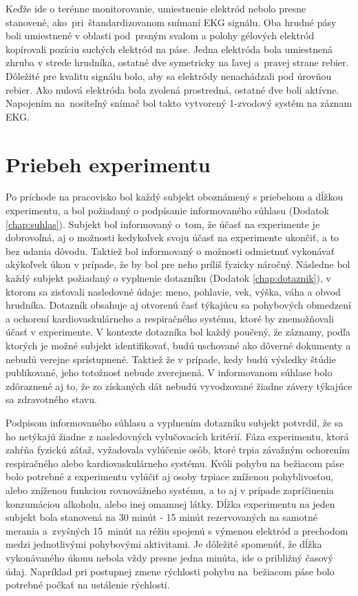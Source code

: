  Keďže ide o terénne monitorovanie, umiestnenie elektród nebolo presne stanovené, ako~pri~štandardizovanom snímaní EKG signálu. Oba hrudné pásy boli umiestnené v oblasti pod~prsným svalom a polohy gélových elektród kopírovali pozíciu suchých elektród na páse. Jedna elektróda bola umiestnená zhruba v strede hrudníka, ostatné dve symetricky na ľavej a~pravej strane rebier. Dôležité pre kvalitu signálu bolo, aby sa elektródy nenachádzali pod úrovňou rebier. Ako nulová elektróda bola zvolená prostredná, ostatné dve boli aktívne. Napojením na~nositeľný snímač bol takto vytvorený 1-zvodový systém na záznam EKG.

\newpage

\section{Priebeh experimentu}

Po príchode na pracovisko bol každý subjekt oboznámený s priebehom a dĺžkou experimentu, a bol požiadaný o podpísanie informovaného súhlasu (Dodatok \ref{chap:suhlas}). Subjekt bol informovaný o~tom, že účasť na experimente je dobrovoľná, aj o možnosti kedykoľvek svoju účasť na experimente ukončiť, a to bez udania dôvodu. Taktiež bol informovaný o možnosti odmietnuť vykonávať akýkoľvek úkon v prípade, že by bol pre neho príliš fyzicky náročný. Následne bol každý subjekt požiadaný o vyplnenie dotazníku (Dodatok \ref{chap:dotaznik}), v ktorom sa zisťovali nasledovné údaje: meno, pohlavie, vek, výška, váha a obvod hrudníka. Dotazník obsahuje aj otvorenú časť týkajúcu sa pohybových obmedzení a ochorení kardiovaskulárneho a respiračného systému, ktoré by znemožňovali účasť v experimente. V kontexte dotazníka bol každý poučený, že záznamy, podľa ktorých je možné subjekt identifikovať, budú uschované ako dôverné dokumenty a nebudú verejne sprístupnené. Taktiež že v prípade, kedy budú výsledky štúdie publikované, jeho totožnosť nebude zverejnená. V informovanom súhlase bolo zdôraznené aj to, že zo získaných dát nebudú vyvodzované žiadne závery týkajúce sa zdravotného stavu.

Podpisom informovaného súhlasu a vyplnením dotazníku subjekt potvrdil, že sa ho netýkajú žiadne z nasledovných vylučovacích kritérií. Fáza experimentu, ktorá zahŕňa fyzickú záťaž, vyžadovala vylúčenie osôb, ktoré trpia závažným ochorením respiračného alebo kardiovaskulárneho systému. Kvôli pohybu na bežiacom páse bolo potrebné z experimentu vylúčiť aj osoby trpiace zníženou pohyblivosťou, alebo zníženou funkciou rovnovážneho systému, a to aj v prípade zapríčinenia konzumáciou alkoholu, alebo inej omamnej látky. Dĺžka experimentu na jeden subjekt bola stanovená na 30 minút - 15 minút rezervovaných na samotné merania a~zvyšných 15~minút na réžiu spojenú s výmenou elektród a prechodom medzi jednotlivými pohybovými aktivitami. Je dôležité spomenúť, že dĺžka vykonávaného úkonu nebola vždy presne jedna minúta, ide o približný časový údaj. Napríklad pri postupnej zmene rýchlosti pohybu na~bežiacom páse bolo potrebné počkať na ustálenie rýchlosti.

